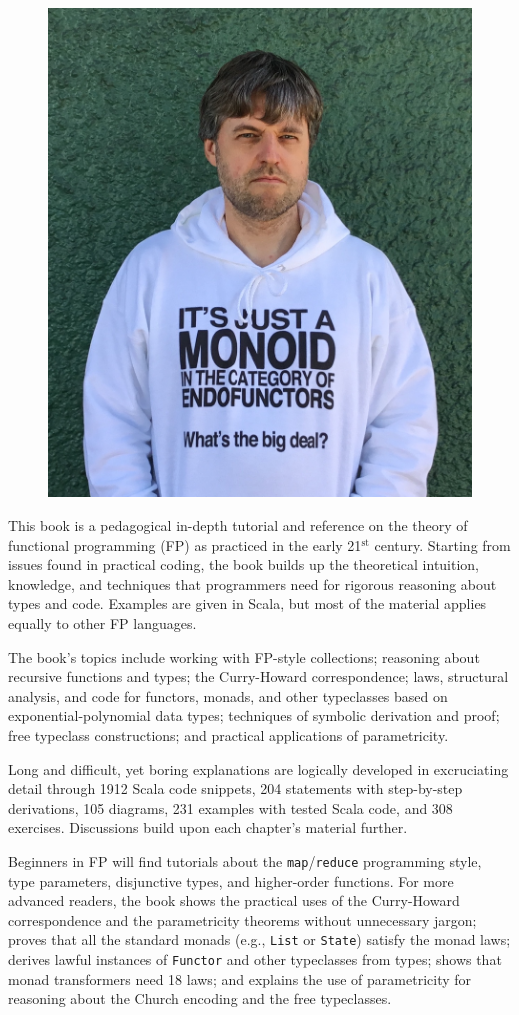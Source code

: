 \onecolumn
\thispagestyle{empty}
 
\begin{figure}
\includegraphics[width=0.4\columnwidth]{monads_evil_face}
\vspace{-2.0\baselineskip}
\end{figure}

\smaller
This book is a pedagogical in-depth tutorial and reference
on the theory of functional programming (FP) as practiced in the early
21$^{\text{st}}$ century. Starting from issues found in practical
coding, the book builds up the theoretical intuition, knowledge, and
techniques that programmers need for rigorous reasoning about types
and code. Examples are given in Scala, but most of the material applies equally
to other FP languages.

The book\textsf{'}s topics include working with FP-style collections; reasoning about recursive
functions and types; the Curry-Howard correspondence; laws, structural
analysis, and code for functors, monads, and other typeclasses based on exponential-polynomial data types; 
techniques of symbolic derivation and proof;
free typeclass constructions; and
practical applications of parametricity.

Long and difficult, yet boring explanations are logically
developed in excruciating detail through 1912
Scala code snippets, 204 statements with step-by-step
derivations, 105 diagrams, 231 examples
with tested Scala code, and 308 exercises. Discussions
build upon each chapter\textsf{'}s material further.

Beginners in FP will find tutorials about the \texttt{map}/\texttt{reduce}
programming style, type parameters, disjunctive types, and higher-order
functions. For more advanced readers, the book shows  the practical
uses of the Curry-Howard correspondence and the parametricity theorems
without unnecessary jargon; proves that all the standard monads (e.g.,
\texttt{List} or \texttt{State})
satisfy the monad laws; derives lawful instances of \texttt{Functor}
and other typeclasses from types; shows that monad transformers need
18 laws;
and explains the use of parametricity for reasoning about the Church encoding and the free typeclasses.

